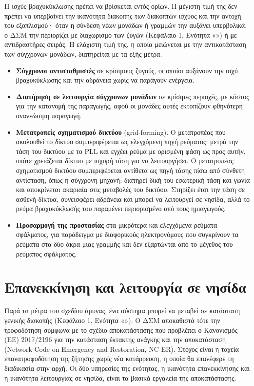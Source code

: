 Η ισχύς βραχυκύκλωσης πρέπει να βρίσκεται εντός ορίων. Η μέγιστη τιμή της δεν πρέπει να
υπερβαίνει την ικανότητα διακοπής των διακοπτών ισχύος και την αντοχή του εξοπλισμού· όταν η
σύνδεση νέων μονάδων ή γραμμών την αυξάνει υπερβολικά, ο ΔΣΜ την περιορίζει με διαχωρισμό των
ζυγών (Κεφάλαιο 1, Ενότητα «») ή με αντιδραστήρες σειράς. Η
ελάχιστη τιμή της, η οποία μειώνεται με την αντικατάσταση των σύγχρονων μονάδων, διατηρείται με
τα εξής μέτρα:

\begin{itemize}
\item \textbf{Σύγχρονοι αντισταθμιστές} σε κρίσιμους ζυγούς, οι οποίοι αυξάνουν την ισχύ
      βραχυκύκλωσης και την αδράνεια χωρίς να παράγουν ενέργεια.
\item \textbf{Διατήρηση σε λειτουργία σύγχρονων μονάδων} σε κρίσιμες περιοχές, με κόστος για την
      κατανομή της παραγωγής, αφού οι μονάδες αυτές εκτοπίζουν φθηνότερη ανανεώσιμη παραγωγή.
\item \textbf{Μετατροπείς σχηματισμού δικτύου} (grid-forming). Ο μετατροπέας που ακολουθεί το
      δίκτυο συμπεριφέρεται ως ελεγχόμενη πηγή ρεύματος: μετρά την τάση του δικτύου με το PLL
      και εγχέει ρεύμα με ορισμένη φάση ως προς αυτήν, οπότε χρειάζεται δίκτυο με ισχυρή τάση
      για να λειτουργήσει. Ο μετατροπέας σχηματισμού δικτύου συμπεριφέρεται αντίθετα ως πηγή
      τάσης πίσω από σύνθετη αντίσταση, όπως η σύγχρονη μηχανή: διατηρεί δική του εσωτερική
      τάση και γωνία και αποκρίνεται ακαριαία στις μεταβολές του δικτύου. Στηρίζει έτσι την
      τάση σε ασθενή δίκτυα, συνεισφέρει αδράνεια και μπορεί να λειτουργεί σε νησίδα, αλλά το
      ρεύμα βραχυκύκλωσής του παραμένει περιορισμένο από τους ημιαγωγούς.
\item \textbf{Προσαρμογή της προστασίας} στα μικρότερα και ελεγχόμενα ρεύματα σφάλματος, για
      παράδειγμα με διαφορικούς ηλεκτρονόμους που συγκρίνουν τα ρεύματα στα δύο άκρα μιας
      γραμμής και δεν εξαρτώνται από το μέγεθος του ρεύματος σφάλματος.
\end{itemize}

\section{Επανεκκίνηση και λειτουργία σε νησίδα}
\label{sec:restoration}

Παρά τα μέτρα του σχεδίου άμυνας, ένα σύστημα μπορεί να μεταβεί σε κατάσταση γενικής διακοπής
(Κεφάλαιο 1, Ενότητα «»). Ο ΔΣΜ αποκαθιστά τότε την τροφοδότηση σύμφωνα με
το σχέδιο αποκατάστασης που προβλέπει ο Κανονισμός (ΕΕ) 2017/2196 για την κατάσταση έκτακτης
ανάγκης και την αποκατάσταση (Network Code on Emergency and Restoration, NC ER). Στόχος είναι η
ταχεία επανατροφοδότηση της ζήτησης χωρίς νέα κατάρρευση, η οποία θα επανέφερε τη διαδικασία
στην αρχή. Οι δύο υπηρεσίες της ενότητας, η ικανότητα επανεκκίνησης και η ικανότητα
λειτουργίας σε νησίδα, είναι τα βασικά εργαλεία της αποκατάστασης.

